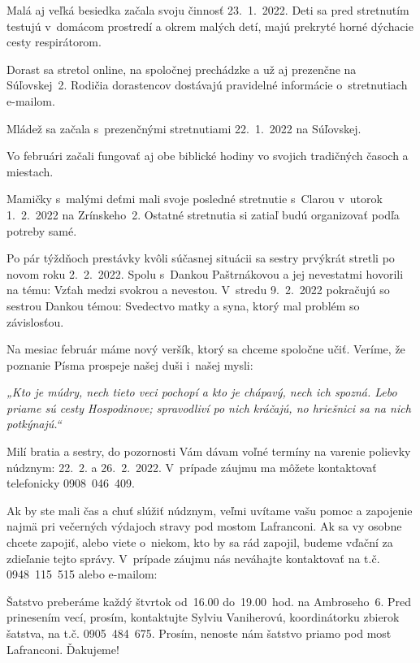 Malá aj veľká besiedka začala svoju činnosť 23.~1.~2022. Deti sa pred stretnutím testujú v~domácom prostredí a okrem malých detí, majú prekryté horné dýchacie cesty respirátorom.

Dorast sa stretol online, na spoločnej prechádzke a už aj prezenčne na Súľovskej~2. Rodičia dorastencov dostávajú pravidelné informácie o~stretnutiach e-mailom.

Mládež sa začala s~prezenčnými stretnutiami 22.~1.~2022 na Súľovskej.


Vo februári začali fungovať aj obe biblické hodiny vo svojich tradičných časoch a miestach.


Mamičky s~malými deťmi mali svoje posledné stretnutie s~Clarou v~utorok 1.~2.~2022 na Zrínskeho~2.
Ostatné stretnutia si zatiaľ budú organizovať podľa potreby samé.


Po pár týždňoch prestávky kvôli súčasnej situácii sa sestry prvýkrát stretli po novom roku 2.~2.~2022. Spolu s~Dankou Paštrnákovou a jej nevestatmi hovorili na tému: Vzťah medzi svokrou a nevestou. V~stredu 9.~2.~2022 pokračujú so sestrou Dankou témou: Svedectvo matky a syna, ktorý mal problém so závislosťou.


Na mesiac február máme nový veršík, ktorý sa chceme spoločne učiť. Veríme, že poznanie Písma prospeje našej duši i~našej mysli:

{\it „Kto je múdry, nech tieto veci pochopí a kto je chápavý, nech ich spozná. Lebo priame sú cesty Hospodinove; spravodliví po nich kráčajú, no hriešnici sa na nich potkýnajú.“}

\vfill\break


Milí bratia a sestry, do pozornosti Vám dávam voľné termíny na varenie polievky núdznym: 22.~2. a 26.~2.~2022. V~prípade záujmu ma môžete kontaktovať telefonicky 0908~046~409.

Ak by ste mali čas a chuť slúžiť núdznym, veľmi uvítame vašu pomoc a zapojenie najmä pri večerných výdajoch stravy pod mostom Lafranconi. Ak sa vy osobne chcete zapojiť, alebo viete o~niekom, kto by sa rád zapojil, budeme vďační za zdieľanie tejto správy. V~prípade záujmu nás neváhajte kontaktovať na t.č. 0948~115~515 alebo e-mailom: 

Šatstvo preberáme každý štvrtok od~16.00 do~19.00~hod. na Ambroseho~6. Pred prinesením vecí, prosím, kontaktujte Sylviu Vaniherovú, koordinátorku zbierok šatstva, na t.č. 0905~484~675.
Prosím, nenoste nám šatstvo priamo pod most Lafranconi. Ďakujeme!

